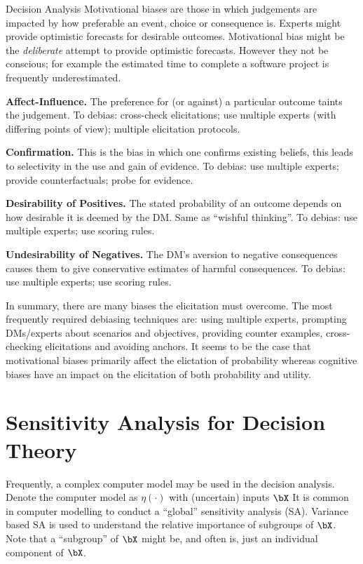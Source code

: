\begin{chapter}{Decision Analysis \label{Ch:decision}}
Motivational biases are those in which judgements are impacted by how preferable an event, choice or consequence is. Experts might provide optimistic forecasts for desirable outcomes. Motivational bias might be the \textit{deliberate} attempt to provide optimistic forecasts. However they not be conscious; for example the estimated time to complete a software project is frequently underestimated.

\noindent\textbf{Affect-Influence.} The preference for (or against) a particular outcome taints the judgement. To debias: cross-check elicitations; use multiple experts (with differing points of view); multiple elicitation protocols.

\noindent\textbf{Confirmation.} This is the bias in which one confirms existing beliefs, this leads to selectivity in the use and gain of evidence. To debias: use multiple experts; provide counterfactuals; probe for evidence.

\noindent\textbf{Desirability of Positives.} The stated probability of an outcome depends on how desirable it is deemed by the DM. Same as ``wishful thinking''. To debias: use multiple experts; use scoring rules.

\noindent\textbf{Undesirability of Negatives.} The DM's aversion to negative consequences causes them to give conservative estimates of harmful consequences. To debias: use multiple experts; use scoring rules.


In summary, there are many biases the elicitation must overcome. The most frequently required debiasing techniques are: using multiple experts, prompting DMs/experts about scenarios and objectives, providing counter examples, cross-checking elicitations and avoiding anchors. It seems to be the case that motivational biases primarily affect the elictation of probability whereas cognitive biases have an impact on the elicitation of both probability and utility.
\section{Sensitivity Analysis for Decision Theory}

Frequently, a complex computer model may be used in the decision analysis. Denote the computer model as $\eta(\cdot)$ with (uncertain) inputs $\bX$ It is common in computer modelling to conduct a ``global'' sensitivity analysis (SA). Variance based SA \citep{Sobol1993,Oakley04} is used to understand the relative importance of subgroups of $\bX$. Note that a ``subgroup'' of $\bX$ might be, and often is, just an individual component of $\bX$.


\end{chapter}
